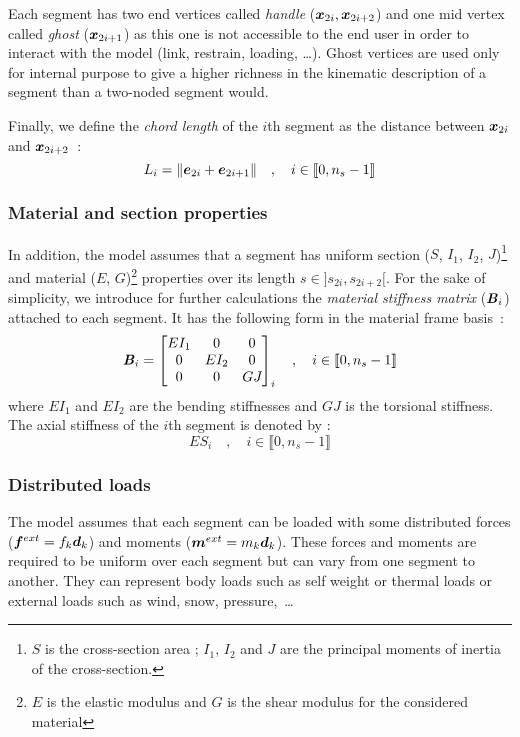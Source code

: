 Each segment has two end vertices called \emph{handle} ($\boldsymbol{x}_{2i}, \boldsymbol{x}_{2i+2}$) and one mid vertex called \emph{ghost} ($\boldsymbol{x}_{2i+1}$) as this one is not accessible to the end user in order to interact with the model (link, restrain, loading, \dots). Ghost vertices are used only for internal purpose to give a higher richness in the kinematic description of a segment than a two-noded segment would.

Finally, we define the \emph{chord length} of the $i$th segment as the distance between $\boldsymbol{x}_{2i}$ and $\boldsymbol{x}_{2i+2}$~:
\begin{equation}
	L_i = \lVert\boldsymbol{e}_{2i} + \boldsymbol{e}_{2i+1}\rVert \quad , \quad i \in \llbracket 0, n_s-1 \rrbracket
\end{equation}

\subsubsection{Material and section properties}
In addition, the model assumes that a segment has uniform section ($S$, $I_1$, $I_2$, $J$)\footnote{$S$ is the cross-section area ; $I_1$, $I_2$ and $J$ are the principal moments of inertia of the cross-section.} and material ($E$, $G$)\footnote{$E$ is the elastic modulus and $G$ is the shear  modulus for the considered material} properties over its length $s \in ]s_{2i},s_{2i+2}[$. For the sake of simplicity, we introduce for further calculations the \emph{material stiffness matrix} ($\boldsymbol{\mathit{B}}_i$) attached to each segment. It has the following form in the material frame basis~:
\begin{equation}
	\boldsymbol{\mathit{B}}_i = \begin{bmatrix} 
			EI_1		&	0		&	0		\\
			0		&	EI_{2}	&	0		\\
			0		&	0		&	GJ_{}	\\
		\end{bmatrix}_i
	\quad , \quad i \in \llbracket 0, n_s-1 \rrbracket
	\label{eq:stiffnessmatrix}
\end{equation}
where $EI_1$ and $EI_2$ are the bending stiffnesses and $GJ$ is the torsional stiffness. The axial stiffness of the $i$th segment is denoted by :
\begin{equation}
	ES_i 	\quad , \quad i \in \llbracket 0, n_s-1 \rrbracket
\end{equation}

\subsubsection{Distributed loads}
The model assumes that each segment can be loaded with some distributed forces ($\boldsymbol{f}^{ext} = f_k\boldsymbol{d}_k$) and moments ($\boldsymbol{m}^{ext} = m_k\boldsymbol{d}_k$). These forces and moments are required to be uniform over each segment but can vary from one segment to another. They can represent body loads such as self weight or thermal loads or external loads such as wind, snow, pressure,~\dots

